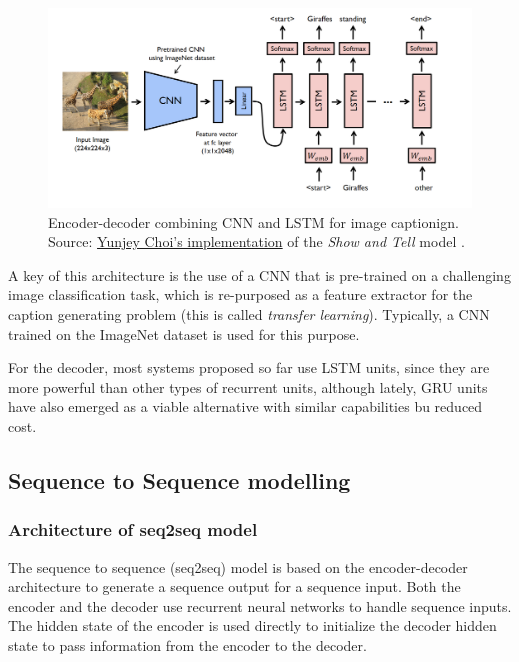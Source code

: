 \begin{figure}[hpt]
	\centering
	\includegraphics[scale=0.3]{images/ch3/cnn-rnn.png}
	\caption{Encoder-decoder combining CNN and LSTM for image captionign. Source:  \href{https://github.com/yunjey/pytorch-tutorial/tree/master/tutorials/03-advanced/image_captioning}{Yunjey Choi's implementation} of the \textit{Show and Tell} model \citep{Vinyals2015}.}
	\label{fig:cnn-rnn}
\end{figure}

A key of this architecture is the use of a CNN that is pre-trained on a challenging image classification task, which is re-purposed as a feature extractor for the caption generating problem (this is called \textit{transfer learning}). Typically, a CNN trained on the ImageNet dataset is used for this purpose.

For the decoder, most systems proposed so far use LSTM units, since they are more powerful than other types of recurrent units, although lately, GRU units have also emerged as a viable alternative with similar capabilities bu reduced cost.

\subsection{Sequence to Sequence modelling}\label{subsec:seq2seq}

\subsubsection{Architecture of seq2seq model}

The sequence to sequence (seq2seq) model is based on the encoder-decoder architecture to generate a sequence output for a sequence input. Both the encoder and the decoder use recurrent neural networks to handle sequence inputs. The hidden state of the encoder is used directly to initialize the decoder hidden state to pass information from the encoder to the decoder.

